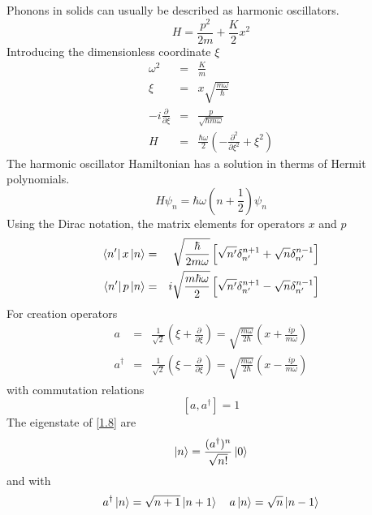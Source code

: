 Phonons in solids can usually be described as harmonic oscillators.
\begin{equation}
    H = \frac{p^2}{2m} + \frac{K}{2} x^2 \label{1.3}
\end{equation}
Introducing the dimensionless coordinate $\xi$
\begin{eqnarray}
    \omega^2 &=& \frac{K}{m} \label{1.4}    \\
    \xi &=& x \sqrt{ \frac{m\omega}{\hbar} }     \label{1.5} \\
    -i \frac{\partial}{\partial \xi}  &=& \frac{p}{\sqrt{\hbar m \omega}} \label{1.6} \\
    H &=& \frac{\hbar \omega}{2} \left( - \frac{\partial^2}{\partial \xi^2} + \xi^2 \right) \label{1.7}
\end{eqnarray}
The harmonic oscillator Hamiltonian has a solution in therms of Hermit polynomials.
\begin{equation}
    H\psi_n = \hbar \omega(n+ \frac{1}{2} ) \psi_n   \label{1.8}
\end{equation}
Using the Dirac notation, the matrix elements for operators $x$ and $p$
\begin{eqnarray}
    \bra{n'}x\ket{n} &=& \sqrt{ \frac{\hbar}{2m\omega} } \left[\sqrt{n'}\delta_{n'}^{n+1} + \sqrt{n}\delta_{n'}^{n-1} \right] \nonumber \\
    \bra{n'}p\ket{n} &=& i\sqrt{ \frac{m\hbar\omega}{2} } \left[\sqrt{n'}\delta_{n'}^{n+1} - \sqrt{n}\delta_{n'}^{n-1} \right] \label{1.9}
\end{eqnarray}
For creation operators
\begin{eqnarray}
    a &=& \frac{1}{\sqrt{2}} \left( \xi + \frac{\partial}{\partial \xi} \right) = \sqrt{ \frac{m\omega}{2\hbar} } \left( x + \frac{ip}{m\omega} \right)   \nonumber \\
    a^\dagger &=& \frac{1}{\sqrt{2}} \left( \xi - \frac{\partial}{\partial \xi} \right) = \sqrt{ \frac{m \omega}{2 \hbar} } \left( x - \frac{ip}{m\omega} \right)   \label{1.10}
\end{eqnarray}
with commutation relations
\begin{equation}
    \left[ a, a^\dagger \right] = 1     \label{1.18}
\end{equation}
The eigenstate of \eqref{1.8} are
\begin{equation}
    \ket{n} = \frac{(a^\dagger)^n}{\sqrt{n!}} \ket{0} \label{1.22}
\end{equation}
and with
\begin{equation}
    a^\dagger\ket{n} = \sqrt{n+1} \ket{n+1} ~ ~ ~ a \ket{n} = \sqrt{n} \ket{n-1}    \label{1.28}
\end{equation}

